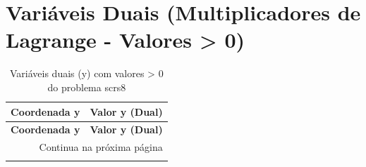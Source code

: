 \documentclass[12pt]{article}
\begin{document}
\section{Variáveis Duais (Multiplicadores de Lagrange - Valores > 0)}

\begin{longtable}{@{}cc@{}}
\caption{Variáveis duais (y) com valores > 0 do problema scrs8} \\
\toprule
\textbf{Coordenada y} & \textbf{Valor y (Dual)} \\
\midrule
\endfirsthead

\toprule
\textbf{Coordenada y} & \textbf{Valor y (Dual)} \\
\midrule
\endhead

\midrule \multicolumn{2}{r}{{Continua na próxima página}} \\ \midrule
\endfoot


\end{longtable}
\end{document}
